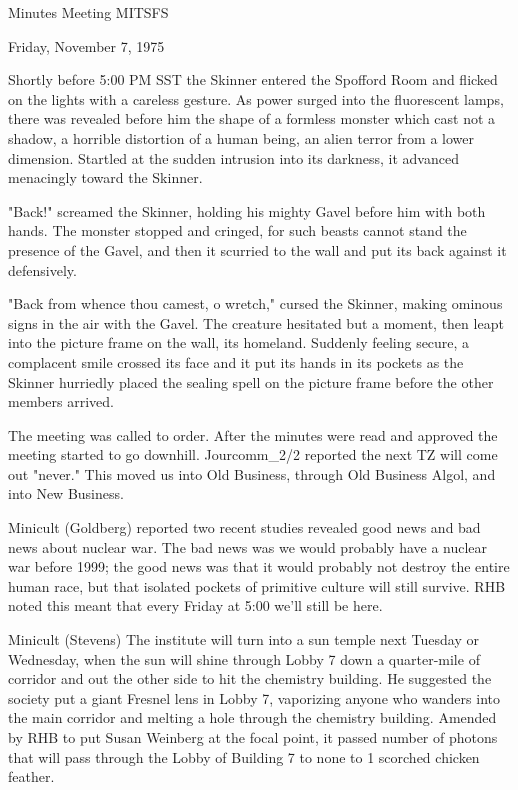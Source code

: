 \documentclass[12pt]{article}
\begin{document}
\begin{center}

Minutes Meeting MITSFS

Friday, November 7, 1975

\end{center}
 
\vspace{12pt}

\setlength{\parskip}{6pt}

\noindent
Shortly before 5:00 PM SST the Skinner entered the Spofford Room and flicked on the lights with a careless gesture. As power surged into the fluorescent lamps, there was revealed before him the shape of a formless monster which cast not a shadow, a horrible distortion of a human being, an alien terror from a lower dimension. Startled at the sudden intrusion into its darkness, it advanced menacingly toward the Skinner.

"Back!" screamed the Skinner, holding his mighty Gavel before him with both hands. The monster stopped and cringed, for such beasts cannot stand the presence of the Gavel, and then it scurried to the wall and put its back against it defensively.

"Back from whence thou camest, o wretch," cursed the Skinner, making ominous signs in the air with the Gavel. The creature hesitated but a moment, then leapt into the picture frame on the wall, its homeland. Suddenly feeling secure, a complacent smile crossed its face and it put its hands in its pockets as the Skinner hurriedly placed the sealing spell on the picture frame before the other members arrived.

The meeting was called to order. After the minutes were read and approved the meeting started to go downhill. Jourcomm_2/2 reported the next TZ will come out "never." This moved us into Old Business, through Old Business Algol, and into New Business.

Minicult (Goldberg) reported two recent studies revealed good news and bad news about nuclear war. The bad news was we would probably have a nuclear war before 1999; the good news was that it would probably not destroy the entire human race, but that isolated pockets of primitive culture will still survive. RHB noted this meant that every Friday at 5:00 we'll still be here.

Minicult (Stevens) The institute will turn into a sun temple next Tuesday or Wednesday, when the sun will shine through Lobby 7 down a quarter-mile of corridor and out the other side to hit the chemistry building. He suggested the society put a giant Fresnel lens in Lobby 7, vaporizing anyone who wanders into the main corridor and melting a hole through the chemistry building. Amended by RHB to put Susan Weinberg at the focal point, it passed number of photons that will pass through the Lobby of Building 7 to none to 1 scorched chicken feather.
\end{document}
